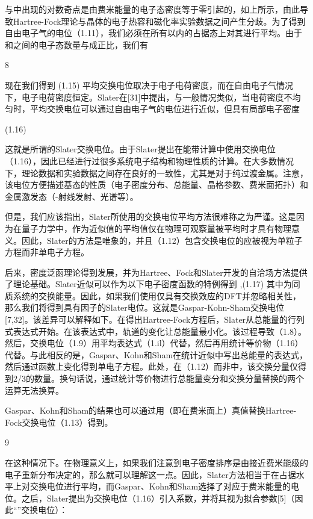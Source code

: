 与中出现的对数奇点是由费米能量的电子态密度等于零引起的，如上所示，由此导致Hartree-Fock理论与晶体的电子热容和磁化率实验数据之间产生分歧。为了得到自由电子气的电位（1.11），我们必须在所有以内的占据态上对其进行平均。由于和之间的电子态数量与成正比，我们有



8

现在我们得到
(1.15)
平均交换电位取决于电子电荷密度，而在自由电子气情况下，电子电荷密度恒定。Slater在[31]中提出，与一般情况类似，当电荷密度不均匀时，平均交换电位可以通过自由电子气的电位进行近似，但具有局部电子密度

(1.16)

这就是所谓的Slater交换电位。由于Slater提出在能带计算中使用交换电位（1.16），因此已经进行过很多系统电子结构和物理性质的计算。在大多数情况下，理论数据和实验数据之间存在良好的一致性，尤其是对于纯过渡金属。注意，该电位方便描述基态的性质（电子密度分布、总能量、晶格参数、费米面拓扑）和金属激发态（-射线发射、光谱等）。

但是，我们应该指出，Slater所使用的交换电位平均方法很难称之为严谨。这是因为在量子力学中，作为近似值的平均值仅在物理可观察量被平均时才具有物理意义。因此，Slater的方法是唯象的，并且（1.12）包含交换电位的应被视为单粒子方程而非单电子方程。

后来，密度泛函理论得到发展，并为Hartree、Fock和Slater开发的自洽场方法提供了理论基础。Slater近似可以作为以下电子密度函数的特例得到
,(1.17)
其中为同质系统的交换能量。因此，如果我们使用仅具有交换效应的DFT并忽略相关性，那么我们将得到具有因子的Slater电位。这就是Gaspar-Kohn-Sham交换电位[7,32]。该差异可以解释如下。在得出Hartree-Fock方程后，Slater从总能量的行列式表达式开始。在该表达式中，轨道的变化让总能量最小化。该过程导致（1.8）。然后，交换电位（1.9）用平均表达式（1.il）代替，然后再用统计等价物（1.16）代替。与此相反的是，Gaspar、Kohn和Sham在统计近似中写出总能量的表达式，然后通过函数上变化得到单电子方程。此处，在（1.12）而非中，该交换分量仅得到2/3的数量。换句话说，通过统计等价物进行总能量变分和交换分量替换的两个运算无法换算。

Gaspar、Kohn和Sham的结果也可以通过用（即在费米面上）真值替换Hartree-Fock交换电位（1.13）得到。

9

在这种情况下。在物理意义上，如果我们注意到电子密度排序是由接近费米能级的电子重新分布决定的，那么就可以理解这一点。因此，Slater方法相当于在占据水平上对交换电位进行平均，而Gaspar、Kohn和Sham选择了对应于费米能量的电位。之后，Slater提出为交换电位（1.16）引入系数，并将其视为拟合参数[5]（因此“”交换电位）：

